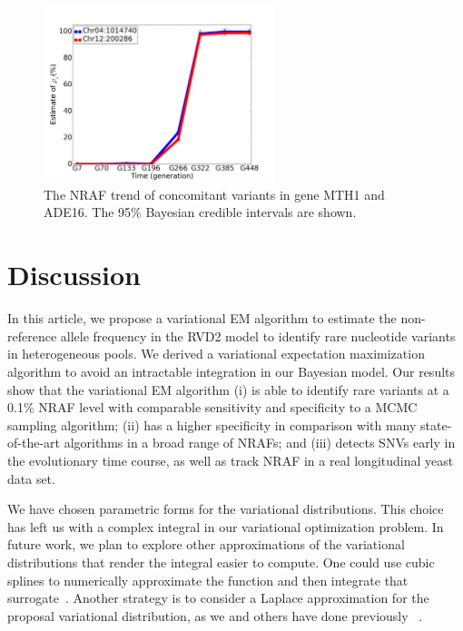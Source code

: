 \documentclass[11pt,reqno]{amsart}
\begin{document}
\begin{figure}[htbp]
\centering
\includegraphics[width=0.6\textwidth]{figs/concomitant.png}
\caption{The NRAF trend of concomitant variants in gene MTH1 and ADE16.
The 95\% Bayesian credible intervals are shown.}
\label{tbl:concomitant}
\end{figure}
\section{Discussion}
In this article, we propose a variational EM algorithm to estimate the non-reference allele frequency in the RVD2 model to identify rare nucleotide variants in heterogeneous pools.
We derived a variational expectation maximization algorithm to avoid an intractable integration in our Bayesian model.
Our results show that the variational EM algorithm
(i) is able to identify rare variants at a 0.1\% NRAF level with comparable sensitivity and specificity to a MCMC sampling algorithm;
(ii) has a higher specificity in comparison with many state-of-the-art algorithms in a broad range of NRAFs;
and (iii) detects SNVs early in the evolutionary time course, as well as track NRAF in a real longitudinal yeast data set.

We have chosen parametric forms for the variational distributions.
This choice has left us with a complex integral in our variational optimization problem.
In future work, we plan to explore other approximations of the variational distributions that render the integral easier to compute.
One could use cubic splines to numerically approximate the function and then integrate that surrogate~\citet{mckinley1998cubic}.
Another strategy is to consider a Laplace approximation for the proposal variational distribution, as we and others have done previously ~\citep{saddiki2014glad, wang2013variational}.
\end{document}
